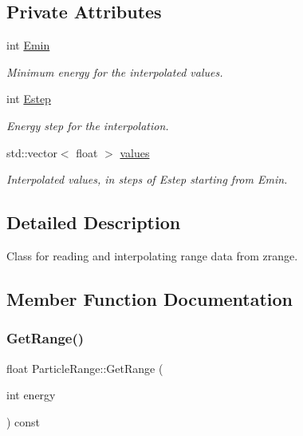 \subsection*{Private Attributes}
\begin{DoxyCompactItemize}
\item 
\mbox{\label{class_particle_range_a372def02fdf702b34d72f202fabaeddf}} 
int \hyperlink{class_particle_range_a372def02fdf702b34d72f202fabaeddf}{Emin}
\begin{DoxyCompactList}\small\item\em Minimum energy for the interpolated values. \end{DoxyCompactList}\item 
\mbox{\label{class_particle_range_a19d2250d887faabb709687b9702f07cf}} 
int \hyperlink{class_particle_range_a19d2250d887faabb709687b9702f07cf}{Estep}
\begin{DoxyCompactList}\small\item\em Energy step for the interpolation. \end{DoxyCompactList}\item 
std\+::vector$<$ float $>$ \hyperlink{class_particle_range_ad9189754855416cfab8079c6baf97217}{values}
\begin{DoxyCompactList}\small\item\em Interpolated values, in steps of Estep starting from Emin. \end{DoxyCompactList}\end{DoxyCompactItemize}


\subsection{Detailed Description}
Class for reading and interpolating range data from \textquotesingle{}zrange\textquotesingle{}. 

\subsection{Member Function Documentation}
\mbox{\label{class_particle_range_a433dead3f85fe19ee1675934b65acf3f}} 
\subsubsection{\texorpdfstring{Get\+Range()}{GetRange()}}
{\footnotesize\ttfamily float Particle\+Range\+::\+Get\+Range (\begin{DoxyParamCaption}\item[{int}]{energy }\end{DoxyParamCaption}) const}



